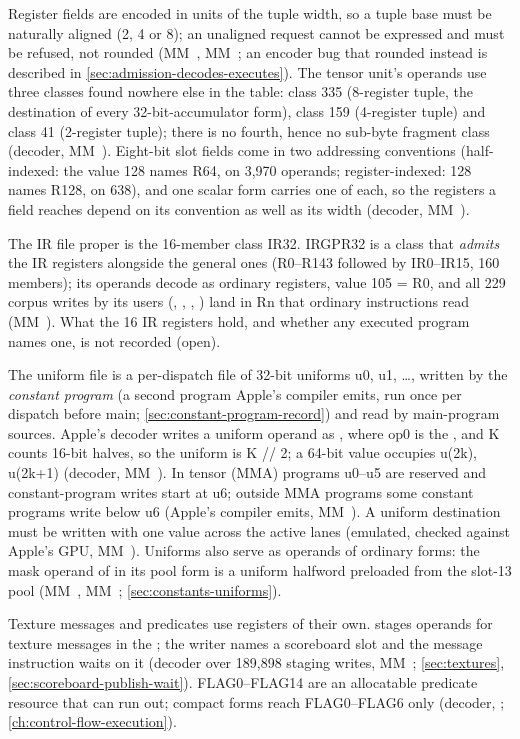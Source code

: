 Register fields are encoded in units of the tuple width, so a tuple base must be naturally
aligned (2, 4 or 8); an unaligned request cannot be expressed and must be refused, not rounded (MM~, MM~; an
encoder bug that rounded instead is described in \cref{sec:admission-decodes-executes}). The tensor unit's operands use three classes found nowhere else in
the table: class 335 (8-register tuple, the destination of every 32-bit-accumulator form), class 159 (4-register
tuple) and class 41 (2-register tuple); there is no fourth, hence no sub-byte fragment class (decoder, MM~). Eight-bit
slot fields come in two addressing conventions (half-indexed: the value 128 names R64, on 3,970 operands;
register-indexed: 128 names R128, on 638), and one scalar form carries one of each, so the registers a field reaches
depend on its convention as well as its width (decoder, MM~).

The IR file proper is the 16-member class IR32. IRGPR32 is a class that \emph{admits} the IR
registers alongside the general ones (R0–R143 followed by IR0–IR15, 160 members); its operands decode as ordinary
registers, value 105 = R0, and all 229 corpus writes by its users (, , , ) land in Rn that ordinary instructions read (MM~). What the 16
IR registers hold, and whether any executed program names one, is not recorded (open).

The uniform file is a per-dispatch file of 32-bit uniforms u0, u1, \dots{}, written by the \emph{constant program} (a second
program Apple's compiler emits, run once per dispatch before main; \cref{sec:constant-program-record}) and read by main-program sources.
Apple's decoder writes a uniform operand as , where op0 is the , and K counts 16-bit halves, so the uniform is K // 2; a 64-bit value occupies u(2k), u(2k+1) (decoder, MM~). In tensor (MMA)
programs u0–u5 are reserved and constant-program writes start at u6; outside MMA programs some constant programs write
below u6 (Apple's compiler emits, MM~). A uniform destination must be written with one value across the active
lanes (emulated, checked against Apple's GPU, MM~). Uniforms also serve as operands of ordinary forms: the mask
operand of  in its pool form is a uniform halfword preloaded from the slot-13
pool (MM~, MM~; \cref{sec:constants-uniforms}).

Texture messages and predicates use registers of their own.  stages operands for texture messages in the
; the writer names a scoreboard slot and the message instruction waits on it (decoder over 189,898 staging
writes, MM~; \cref{sec:textures}, \cref{sec:scoreboard-publish-wait}). FLAG0–FLAG14 are an allocatable predicate resource that can run out; compact forms reach FLAG0–FLAG6 only (decoder,
; \cref{ch:control-flow-execution}).

